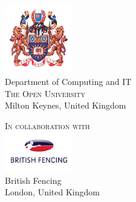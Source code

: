 \begin{titlepage}
\begin{center}
\begin{center}
\includegraphics[width=3cm]{Open_University_coat_of_arms.png}\\[0.4in]
\Large{Department of Computing and IT}\\
\normalsize
\textsc{The Open University}\\
Milton Keynes, United Kingdom \\
\vspace{0.2cm}
\end{center}
\begin{center}
\textsc{In collaboration with}\\[0.2in]
\includegraphics[width=3cm]{british-fencing.png}\\[0.1in]
\Large{British Fencing}\\
\normalsize
London, United Kingdom \\
\vspace{0.2cm}
\end{center}

\end{center}


\end{titlepage}
